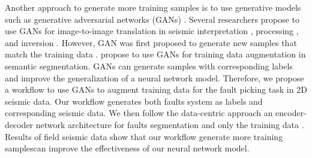 Another approach to generate more training samples is to use generative models such as generative adversarial networks (GANs) \cite[]{goodfellow2014,wu2016,arjovsky2017,isola2017}. Several researchers propose to use GANs for image-to-image translation in seismic interpretation \cite[]{liu2020,kaur2021}, processing \cite[]{picetti2018,yuan2020,kaur2020,kaur2021}, and inversion \cite[]{mosser2019,kaur2020,wang2021}. However, GAN was first proposed to generate new samples that match the training data \cite[]{goodfellow2014}. \cite{neff2018,zhao2018,sandfort2019,pandey2020} propose to use GANs for training data augmentation in semantic segmentation. GANs can generate samples with corresponding labels and improve the generalization of a neural network model. Therefore, we propose a workflow to use GANs to augment training data for the fault picking task in 2D seismic data. Our workflow generates both faults system as labels and corresponding seismic data. We then follow the data-centric approach  an encoder-decoder network architecture for faults segmentation \cite[]{olaf2015,wu2019} and only  the training data . Results of field seismic data show that our workflow generate more training samplescan improve the effectiveness of our neural network model. 

